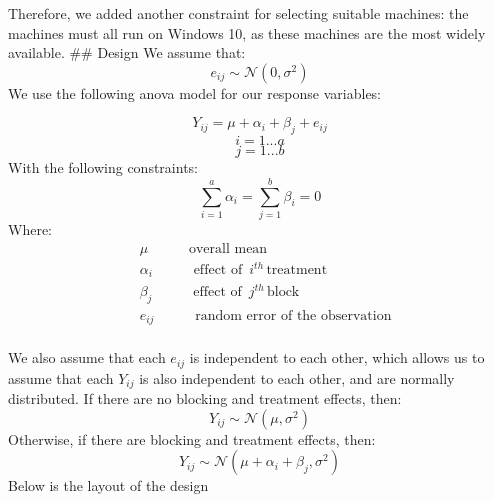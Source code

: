 \documentclass[12pt,halfline,a4paper,]{ouparticle}
\begin{document}
Therefore, we added another constraint for selecting suitable machines:
the machines must all run on Windows 10, as these machines are the most
widely available. \#\# Design We assume that: \[
e_{ij} \sim \mathcal{N}(0, \sigma^2)
\] We use the following anova model for our response variables:

\[
Y_{ij} = \mu + \alpha_i + \beta_j+ e_{ij}
\] \[
i = 1 ...a
\] \[
j = 1 ...b
\] With the following constraints: \[
\sum_{i=1}^a \alpha_i = \sum_{j=1}^b \beta_i =0 
\] Where: \[
\begin{aligned}
&\mu\hspace{35pt}  \text{overall mean} \\
&\alpha_i\hspace{35pt} \text{effect of }\, i^{th}\, \text{treatment}\\
&\beta_j\hspace{35pt} \text{effect of }\, j^{th}\, \text{block}\\
&e_{ij}\hspace{35pt} \text{random error of the observation}\\
\end{aligned}
\]

We also assume that each \(e_{ij}\) is independent to each other, which
allows us to assume that each \(Y_{ij}\) is also independent to each
other, and are normally distributed. If there are no blocking and
treatment effects, then: \[
Y_{ij} \sim \mathcal{N}(\mu, \sigma^2)
\] Otherwise, if there are blocking and treatment effects, then: \[
Y_{ij} \sim \mathcal{N}(\mu + \alpha_i + \beta_j, \sigma^2)
\] Below is the layout of the design
\end{document}

